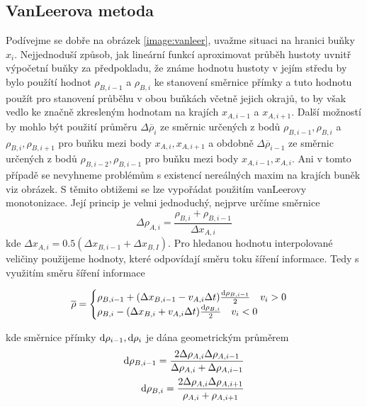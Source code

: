 \subsection{VanLeerova metoda}
Podívejme se dobře na obrázek \ref{image:vanleer}, uvažme situaci na hranici buňky $x_i$. Nejjednoduší způsob, jak lineární funkcí aproximovat průběh hustoty uvnitř výpočetní buňky za předpokladu, že známe hodnotu hustoty v jejím středu by bylo použítí hodnot $\rho_{B,i-1}$ a $\rho_{B,i}$ ke stanovení směrnice přímky a tuto hodnotu použít pro stanovení průběhu v obou buňkách včetně jejich okrajů, to by však vedlo ke značně zkresleným hodnotam na krajích $x_{A,i-1}$ a $x_{A,i+1}$. Další možností by mohlo být použití průměru $\Delta\overline{\rho}_{i}$ ze směrnic určených z bodů $\rho_{B,i-1},\rho_{B,i}$ a $\rho_{B,i},\rho_{B,i+1}$ pro buňku mezi body $x_{A,i},x_{A,i+1}$ a obdobně $\Delta\overline{\rho}_{i-1}$ ze směrnic určených z bodů $\rho_{B,i-2},\rho_{B,i-1}$ pro buňku mezi body $x_{A,i-1},x_{A,i}$. Ani v tomto případě se nevyhneme problémům s existencí nereálných maxim na krajích buněk viz obrázek. S těmito obtižemi se lze vypořádat použitím vanLeerovy monotonizace. Její princip je velmi jednoduchý, nejprve určíme směrnice
\begin{equation}
\Delta\rho_{A,i} = \frac{\rho_{B,i}+\rho_{B,i-1}}{\Delta{x_{A,i}}}
\end{equation}
kde $\Delta{x_{A,i}}=0.5(\Delta x_{B,i-1}+\Delta x_{B,I})$. Pro hledanou hodnotu interpolované veličiny použijeme hodnoty, které odpovídají směru toku šíření informace. Tedy s využitím směru šíření informace
\begin{tcolorbox}[title=Advekce hustoty - VanLeer schéma]
\begin{equation}
\overline{\rho} =
\begin{cases}
 \rho_{B,i-1}+(\Delta x_{B,i-1}-v_{A,i}\Delta t)\frac{{\rm d}\rho_{B,i-1}}{2} \quad v_i > 0 \\
 \rho_{B,i}-(\Delta x_{B,i}+v_{A,i}\Delta t)\frac{{\rm d}\rho_{B,i}}{2} \quad v_i < 0
\end{cases}
\end{equation}
\end{tcolorbox}
kde směrnice přímky ${\rm d}\rho_{i-1},{\rm d}\rho_{i}$ je dána geometrickým průměrem
\begin{eqnarray}
{\rm d}\rho_{B,i-1} =\frac{2\Delta\rho_{A,i}\Delta{\rho_{A,i-1}}}{\Delta \rho_{A,i}+\Delta \rho_{A,i-1}} \\
{\rm d}\rho_{B,i} = \frac{2\Delta\rho_{A,i}\Delta{\rho_{A,i+1}}}{\rho_{A,i}+\rho_{A,i+1}}
\end{eqnarray}
